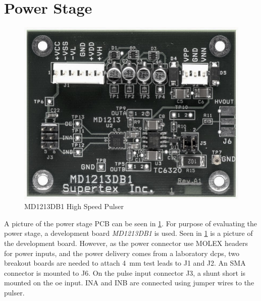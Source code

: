 \section{Power Stage}
\begin{figure}[htbp]
	\centering
	\includegraphics[width=.8\textwidth]{Figures/4_transmitter_pcb_pic.jpg}
	\caption{MD1213DB1 High Speed Pulser}
	\label{fig:4_transmitter_pcb_pic}
\end{figure}
A picture of the power stage PCB can be seen in \cref{fig:4_transmitter_pcb_pic}. For purpose of evaluating the power stage, a development board \textit{MD1213DB1} is used. Seen in \cref{fig:4_transmitter_pcb_pic} is a picture of the development board. However, as the power connector use MOLEX headers for power inputs, and the power delivery comes from a laboratory \gls{dcps}, two breakout boards are needed to attach \qty{4}{\milli\meter} test leads to J1 and J2. An SMA connector is mounted to J6. On the pulse input connector J3, a shunt short is mounted on the \gls{oe} input. INA and INB are connected using jumper wires to the pulser.

